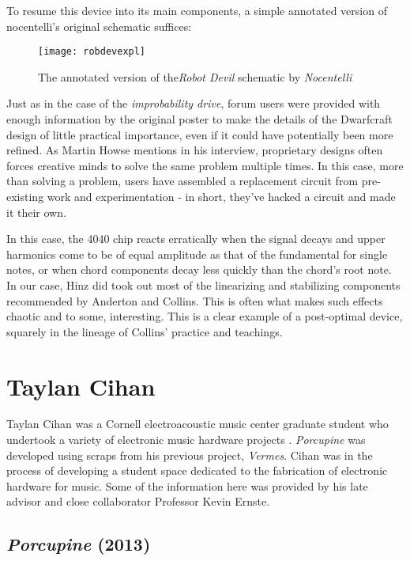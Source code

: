 To resume this device into its main components, a simple annotated version of nocentelli's original schematic suffices: 

\begin{figure}[H]
	  \centering
	    \texttt{[image: robdevexpl]}
	    \caption{The annotated version of the\textit{Robot Devil} schematic by \textit{Nocentelli}}
	\end{figure} 

Just as in the case of the \emph{improbability drive}, forum users were provided with enough information by the original poster to make the details of the Dwarfcraft design of little practical importance, even if it could have potentially been more refined. As Martin Howse mentions in his interview, proprietary designs often forces creative minds to solve the same problem multiple times. In this case, more than solving a problem, users have assembled a replacement circuit from pre-existing work and experimentation - in short, they've hacked a circuit and made it their own. 

In this case, the 4040 chip reacts erratically when the signal decays and upper harmonics come to be of equal amplitude as that of the fundamental for single notes, or when chord components decay less quickly than the chord's root note. In our case, Hinz did took out most of the linearizing and stabilizing components recommended by Anderton and Collins. This is often what makes such effects chaotic and to some, interesting. This is a clear example of a post-optimal device, squarely in the lineage of Collins' practice and teachings. 

\section{Taylan Cihan}

Taylan Cihan was a Cornell electroacoustic music center graduate student who undertook a variety of electronic music hardware projects \citep{taylan}. \textit{Porcupine} was developed using scraps from his previous project, \textit{Vermes}. Cihan was in the process of developing a student space dedicated to the fabrication of electronic hardware for music. Some of the information here was provided by his late advisor and close collaborator Professor Kevin Ernste. 

\subsection{\textit{Porcupine} (2013)}

